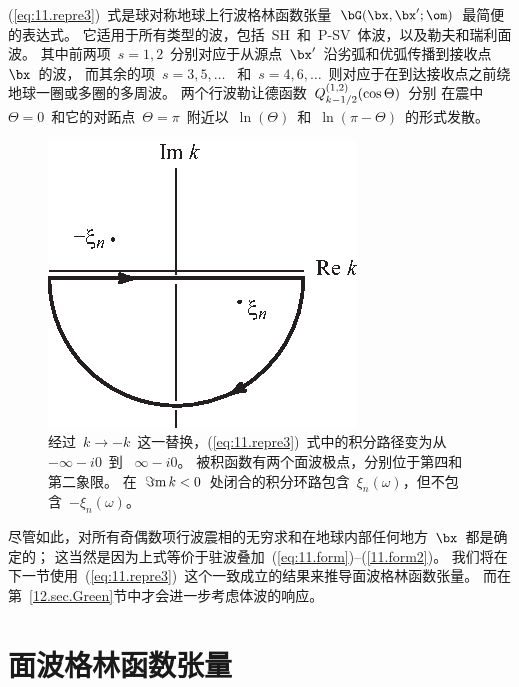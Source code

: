 (\ref{eq:11.repre3})~式是球对称地球上行波格林函数张量~$\bG(\bx,\bx';\om)$~最简便的表达式。
它适用于所有类型的波，包括~SH~和~P-SV~体波，以及勒夫和瑞利面波。
其中前两项~$s=1,2$~分别对应于从源点~$\bx'$~沿劣弧和优弧传播到接收点~$\bx$~的波，
而其余的项~$s=3,5,\ldots$ ~和~$s=4,6,\ldots$~则对应于在到达接收点之前绕地球一圈或多圈的多周波。
两个行波勒让德函数~$Q_{\raisebox{0.5ex}{$\scriptstyle k-1/2$}}
^{\raisebox{-0.5ex}{\scriptsize (1,2)}}(\cos\Theta)$~分别
在震中~$\Theta=0$~和它的对跖点~$\Theta=\pi$~附近以~$\ln(\Theta)$~和~$\ln(\pi-\Theta)$~的形式发散。
\begin{figure}[!t]
\begin{center}
\includegraphics{../figures/chap11/fig02.eps}
\end{center}
\caption[Green contour]{\label{fig.Gcontour}
经过~$k\rightarrow -k$~这一替换，(\ref{eq:11.repre3})~式中的积分路径变为从~$-\infty-i0$~到 ~$\infty-i0$。
被积函数有两个面波极点，分别位于第四和第二象限。
在~$\Im{\rm m}\,k<0$~处闭合的积分环路包含~$\xi_n(\omega)$，但不包含~$-\xi_n(\omega)$。}
\end{figure}
%
尽管如此，对所有奇偶数项行波震相的无穷求和在地球内部任何地方~$\bx$~都是确定的；
这当然是因为上式等价于驻波叠加~(\ref{eq:11.form})--(\ref{11.form2})。
我们将在下一节使用~(\ref{eq:11.repre3})~这个一致成立的结果来推导面波格林函数张量。
而在第~\ref{12.sec.Green}节中才会进一步考虑体波的响应。
%

\section{面波格林函数张量}
%
%
%

